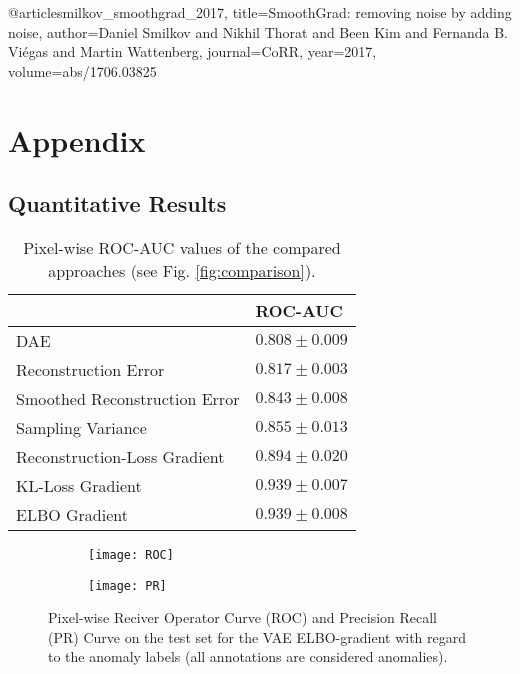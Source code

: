 \documentclass{article}
\begin{document}
@article{smilkov_smoothgrad_2017,
  title={SmoothGrad: removing noise by adding noise},
  author={Daniel Smilkov and Nikhil Thorat and Been Kim and Fernanda B. Vi{\'e}gas and Martin Wattenberg},
  journal={CoRR},
  year={2017},
  volume={abs/1706.03825}
} 


\newpage

\section{Appendix}

\subsection{Quantitative Results}

\begin{table}[ht!]
\renewcommand\thetable{1}
\centering
\begin{tabular}{|l|l|}
\hline
                              & ROC-AUC        \\ \hline
DAE                           & $0.808 \pm 0.009$ \\ \hline
Reconstruction Error          & $0.817 \pm 0.003$ \\ \hline
Smoothed Reconstruction Error & $0.843 \pm 0.008$ \\ \hline
Sampling Variance             & $0.855 \pm 0.013$ \\ \hline
Reconstruction-Loss Gradient  & $0.894 \pm 0.020$ \\ \hline
KL-Loss Gradient              & $0.939 \pm 0.007$ \\ \hline
ELBO Gradient                 & $0.939 \pm 0.008$ \\ \hline
\end{tabular}
\vspace{0.7em}
\caption{Pixel-wise ROC-AUC values of the compared approaches (see Fig. \ref{fig:comparison}).}
\label{tab:results}
\end{table}

\begin{figure}[ht!]
  \centering
  \begin{subfigure}[b]{0.49\textwidth}
      \centering
      \texttt{[image: ROC]}
\end{subfigure}
  \begin{subfigure}[b]{0.49\textwidth}
    \centering
    \texttt{[image: PR]}
\end{subfigure}
\caption{Pixel-wise Reciver Operator Curve (ROC) and Precision Recall (PR) Curve on the test set for the VAE ELBO-gradient with regard to the anomaly labels (all annotations are considered anomalies).}
\label{fig:curves}
\end{figure}
\end{document}
